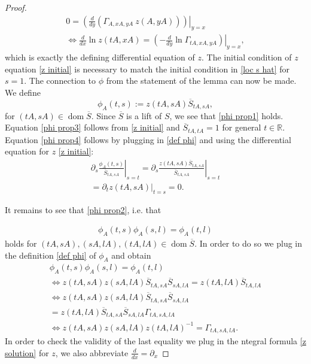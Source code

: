 \documentclass[b5paper,draft,openbib,12pt]{memoir}
\DeclareMathOperator{\dom}{dom}
\begin{document}
\begin{proof}
\begin{align}
0=\left.\left(\frac{d}{dy}(\Gamma_{ A, x A, y A} ~z( A, y A))\right)\right|_{y=x}\\
\iff \frac{d}{dx}\ln z(tA, xA)=\left.\left(-\frac{d}{dy}\ln \Gamma_{t A, xA, yA}\right)\right|_{y=x},
\end{align}
which is exactly the defining differential equation of \(z\). The initial condition of \(z\) equation \eqref{z initial} 
is necessary to match the initial condition in \eqref{loc s hat} for \(s=1\).
The connection to \(\phi\) from the statement of the lemma can now be made.
We define 
\begin{equation}\label{def phi}
\phi_A(t,s):=z(t A, s A) \overline{S}_{t A, s A},
\end{equation}
for \((tA,sA)\in\dom\overline{S}\). Since \(\overline{S}\) is a lift of \(S\), we see that
 \eqref{phi prop1} holds. Equation \eqref{phi prop3} follows from \eqref{z initial} and 
 \(\overline{S}_{tA, tA}=1\) for general \(t\in\mathbb{R}\).
 Equation \eqref{phi prop4} follows by plugging in 
\eqref{def phi} and using the differential equation for \(z\) \eqref{z initial}:
\begin{align}
\partial_s \left.\frac{\phi_A(t,s)}{\overline{S}_{t A,sA}}\right|_{s=t}
=\partial_s \left.\frac{z(tA,sA)\overline{S}_{t A, sA}}{\overline{S}_{t A, s A}}\right|_{s=t}\\
=\partial_t \left.z(tA, sA)\right|_{t=s}=0.
\end{align}


It remains to see that \eqref{phi prop2}, i.e. that 

\begin{align}\label{consistency phi}
\phi_A(t,s)\phi_A(s,l)=\phi_A(t,l)
\end{align}
holds for \((tA,sA),(sA,lA),(tA,lA)\in\dom\overline{S}\). 
In order to do so we plug in the definition \eqref{def phi} of \(\phi_A\) and obtain
\begin{align}
\phi_A(t,s)\phi_A(s,l)=\phi_A(t,l)\\
\iff z(tA,sA) z(sA,lA)\overline{S}_{tA,sA}\overline{S}_{sA,lA}=z(tA,lA)\overline{S}_{tA,lA}\\
\iff z(tA,sA) z(sA,lA)\overline{S}_{tA,sA}\overline{S}_{sA,lA}\\
=z(tA,lA)\overline{S}_{tA,s A} \overline{S}_{sA,lA}\Gamma_{tA,sA,lA}\\
\iff z(tA,sA) z(sA,lA)z(tA,lA)^{-1}=\Gamma_{tA,sA,lA}.
\end{align}
In order to check the validity of the last equality we plug in the 
ntegral formula \eqref{z solution} for \(z\), we also abbreviate 
\(\frac{d}{d x}=\partial_x\)


\end{proof}
\end{document}
